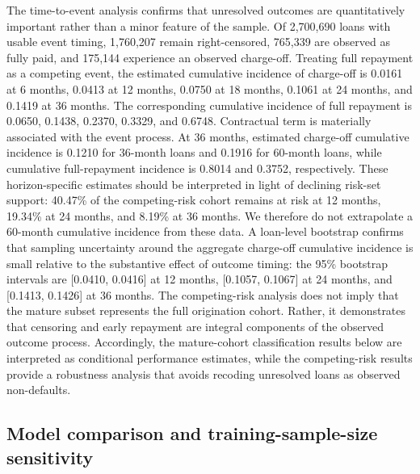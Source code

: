 \documentclass[10pt]{article}
\begin{document}
The time-to-event analysis confirms that unresolved outcomes are quantitatively important rather than a minor feature of the sample. Of 2,700,690 loans with usable event timing, 1,760,207 remain right-censored, 765,339 are observed as fully paid, and 175,144 experience an observed charge-off. Treating full repayment as a competing event, the estimated cumulative incidence of charge-off is 0.0161 at 6 months, 0.0413 at 12 months, 0.0750 at 18 months, 0.1061 at 24 months, and 0.1419 at 36 months. The corresponding cumulative incidence of full repayment is 0.0650, 0.1438, 0.2370, 0.3329, and 0.6748. Contractual term is materially associated with the event process. At 36 months, estimated charge-off cumulative incidence is 0.1210 for 36-month loans and 0.1916 for 60-month loans, while cumulative full-repayment incidence is 0.8014 and 0.3752, respectively. These horizon-specific estimates should be interpreted in light of declining risk-set support: 40.47\% of the competing-risk cohort remains at risk at 12 months, 19.34\% at 24 months, and 8.19\% at 36 months. We therefore do not extrapolate a 60-month cumulative incidence from these data. A loan-level bootstrap confirms that sampling uncertainty around the aggregate charge-off cumulative incidence is small relative to the substantive effect of outcome timing: the 95\% bootstrap intervals are [0.0410, 0.0416] at 12 months, [0.1057, 0.1067] at 24 months, and [0.1413, 0.1426] at 36 months. The competing-risk analysis does not imply that the mature subset represents the full origination cohort. Rather, it demonstrates that censoring and early repayment are integral components of the observed outcome process. Accordingly, the mature-cohort classification results below are interpreted as conditional performance estimates, while the competing-risk results provide a robustness analysis that avoids recoding unresolved loans as observed non-defaults.

\subsection{Model comparison and training-sample-size sensitivity}
\label{sec:modelcomparison}
\end{document}
